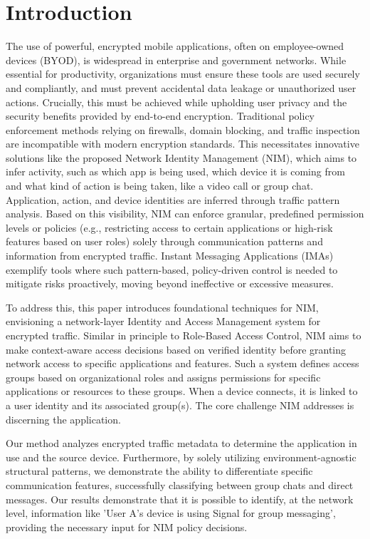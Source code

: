 \documentclass[conference]{IEEEtran}
\begin{document}
\section{Introduction}
The use of powerful, encrypted mobile applications, often on employee-owned devices (BYOD), is widespread in enterprise and government networks. While essential for productivity, organizations must ensure these tools are used securely and compliantly, and must prevent accidental data leakage or unauthorized user actions. Crucially, this must be achieved while upholding user privacy and the security benefits provided by end-to-end encryption. Traditional policy enforcement methods relying on firewalls, domain blocking, and traffic inspection are incompatible with modern encryption standards. This necessitates innovative solutions like the proposed Network Identity Management (NIM), which aims to infer activity, such as which app is being used, which device it is coming from and what kind of action is being taken, like a video call or group chat. Application, action, and device identities are inferred through traffic pattern analysis. Based on this visibility, NIM can enforce granular, predefined permission levels or policies (e.g., restricting access to certain applications or high-risk features based on user roles) solely through communication patterns and information from encrypted traffic. Instant Messaging Applications (IMAs) exemplify tools where such pattern-based, policy-driven control is needed to mitigate risks proactively, moving beyond ineffective or excessive measures.

To address this, this paper introduces foundational techniques for NIM, envisioning a network-layer Identity and Access Management system for encrypted traffic. Similar in principle to Role-Based Access Control, NIM aims to make context-aware access decisions based on verified identity before granting network access to specific applications and features. Such a system defines access groups based on organizational roles and assigns permissions for specific applications or resources to these groups. When a device connects, it is linked to a user identity and its associated group(s). The core challenge NIM addresses is discerning the application. %

Our method analyzes encrypted traffic metadata to determine the application in use and the source device. Furthermore, by solely utilizing environment-agnostic structural patterns, we demonstrate the ability to differentiate specific communication features, successfully classifying between group chats and direct messages. Our results demonstrate that it is possible to identify, at the network level, information like 'User A's device is using Signal for group messaging', providing the necessary input for NIM policy decisions.
\end{document}
